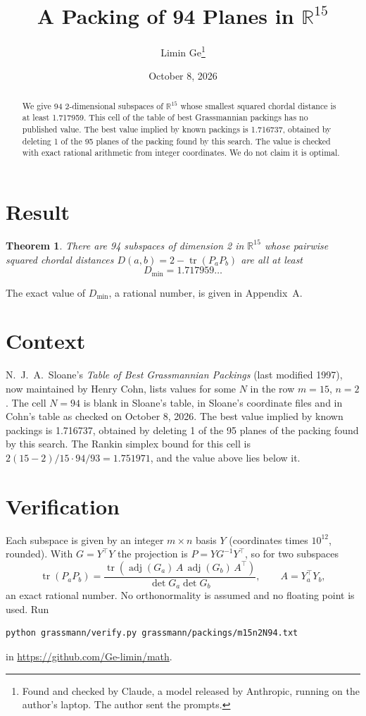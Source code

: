 \documentclass[11pt,a4paper]{article}
\title{A Packing of 94 Planes in $\mathbb{R}^{15}$}
\author{Limin Ge\thanks{Found and checked by Claude, a model released by Anthropic, running on the author's laptop. The author sent the prompts.}}
\date{October 8, 2026}
\newtheorem*{theorem}{Theorem}
\begin{document}
\maketitle
\begin{abstract}
We give 94 2-dimensional subspaces of $\mathbb{R}^{15}$ whose smallest squared chordal distance is at least 1.717959. This cell of the table of best Grassmannian packings has no published value. The best value implied by known packings is 1.716737, obtained by deleting 1 of the 95 planes of the packing found by this search. The value is checked with exact rational arithmetic from integer coordinates. We do not claim it is optimal.
\end{abstract}

\section{Result}
\begin{theorem}
There are 94 subspaces of dimension 2 in $\mathbb{R}^{15}$ whose pairwise squared chordal distances $D(a,b) = 2 - \operatorname{tr}(P_aP_b)$ are all at least
\[ D_{\min} = 1.717959\ldots \]
\end{theorem}
The exact value of $D_{\min}$, a rational number, is given in Appendix~A.


\section{Context}
N.~J.~A.~Sloane's \emph{Table of Best Grassmannian Packings} (last modified 1997), now maintained by Henry Cohn, lists values for some $N$ in the row $m=15$, $n=2$. The cell $N=94$ is blank in Sloane's table, in Sloane's coordinate files and in Cohn's table as checked on October 8, 2026. The best value implied by known packings is 1.716737, obtained by deleting 1 of the 95 planes of the packing found by this search. The Rankin simplex bound for this cell is $2(15-2)/15\cdot 94/93 = 1.751971$, and the value above lies below it.


\section{Verification}
Each subspace is given by an integer $m\times n$ basis $Y$ (coordinates times $10^{12}$, rounded). With $G=Y^\top Y$ the projection is $P=YG^{-1}Y^\top$, so for two subspaces
\[ \operatorname{tr}(P_aP_b)=\frac{\operatorname{tr}(\operatorname{adj}(G_a)\,A\,\operatorname{adj}(G_b)\,A^\top)}{\det G_a\det G_b},\qquad A=Y_a^\top Y_b, \]
an exact rational number. No orthonormality is assumed and no floating point is used. Run
\begin{verbatim}
python grassmann/verify.py grassmann/packings/m15n2N94.txt
\end{verbatim}
in \url{https://github.com/Ge-limin/math}.
\end{document}
